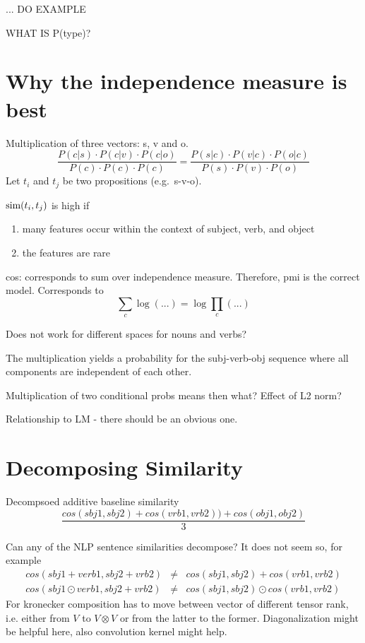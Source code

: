 ...
DO EXAMPLE


WHAT IS P(type)?

\section{Why the independence measure is best}

Multiplication of three vectors: s, v and o.
\[
\frac{
P(c|s) \cdot P(c|v) \cdot P(c|o)}{
P(c) \cdot P(c) \cdot P(c)} =
\frac{
P(s|c) \cdot P(v|c) \cdot P(o|c)
}{
P(s) \cdot P(v) \cdot P(o)
}
\]
Let $t_i$ and $t_j$ be two propositions
(e.g.~s-v-o).

$\textmd{sim}(t_i,t_j)$ is high if
\begin{enumerate}
\item many features occur within the context of subject, verb, and object
\item the features are rare
\end{enumerate}

cos: corresponds to sum over independence measure.
Therefore, pmi is the correct model.
Corresponds to
\[
\sum_c \log(...) = \log \prod_c(...)
\]



Does not work for different
spaces for nouns and verbs?

The multiplication yields a probability
for the subj-verb-obj sequence where all
components are independent of each other.

Multiplication of two conditional probs means then what?
Effect of L2 norm?


Relationship to LM - there should be an obvious one.


\section{Decomposing Similarity}
Decompsoed additive baseline similarity
\[
\frac{cos(sbj1,sbj2) + cos(vrb1,vrb2)) + cos(obj1,obj2)}{3}
\]

Can any of the NLP sentence similarities decompose? It does not seem so, for example
\begin{eqnarray*}
cos(sbj1+verb1,sbj2+vrb2) &\neq& cos(sbj1, sbj2) + cos(vrb1,vrb2) \\
cos(sbj1\odot verb1,sbj2+vrb2) &\neq& cos(sbj1, sbj2) \odot cos(vrb1,vrb2)
\end{eqnarray*}
For kronecker composition has to move between vector of different tensor rank, i.e. either from $V$ to $V \otimes V$ or from the latter to the former. Diagonalization might be helpful here, also convolution kernel might help. 

